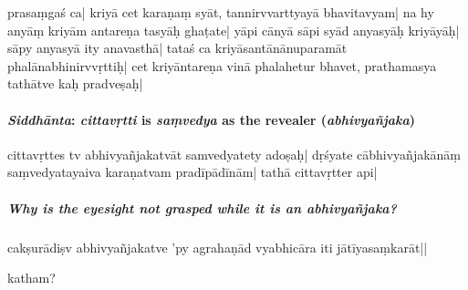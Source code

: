 %
prasaṃga\mds ś ca| %
kriyā cet karaṇaṃ syāt, tannirvvarttyayā \mde 
{} %
bhavitavya\mds m| na hy anyāṃ kriyām antareṇa tasyāḥ 
ghaṭate| yāpi cānyā sāpi 
syād anyasyāḥ kriy\mde āyāḥ| sāpy anyasyā ity anavasthā| %
tataś ca kriyāsantānānupara\mds māt %
phalānabhinirvvṛttiḥ| 
cet kriyānta\mde reṇa vinā phalahe\mds tur bhavet, prathamasya tathātve kaḥ pradveṣaḥ| 

\paragraph{\emph{Siddhānta}: \emph{cittavṛtti} is \emph{saṃvedya} as the revealer (\emph{abhivyañjaka})}

cittavṛttes tv abhivyañjakatvāt samvedyatety adoṣaḥ| %
dṛśyate cā\mde bhivyañjakā\-nāṃ 
%
saṃvedyatayaiva karaṇatvam pra\mds dīpādīnām|
tathā cittavṛtter api| 

\subparagraph{Why is the eyesight not grasped while it is an \emph{abhivyañjaka}?}

cakṣurādiṣv abhi\mde vyañjakatve \mds 'py agrahaṇād vyabhicāra 
iti %
jātīyasaṃkarāt||

katham?

